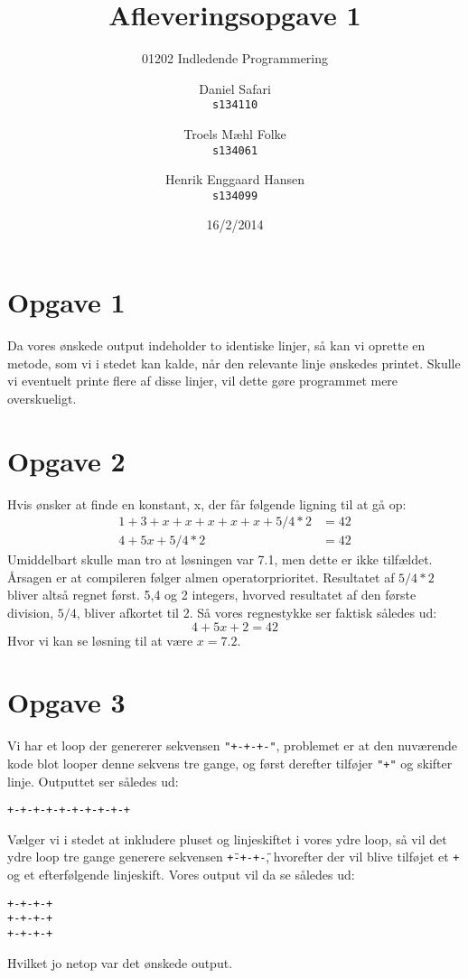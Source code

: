 \documentclass{scrartcl}
\begin{document}

\title{Afleveringsopgave 1}
\subtitle{01202 Indledende Programmering}
\author{
  Daniel Safari\\
  \texttt{s134110}
  \and
  Troels Mæhl Folke\\
  \texttt{s134061}
   \and
  Henrik Enggaard Hansen\\
  \texttt{s134099}
}
\date{16/2/2014}
\maketitle

\section*{Opgave 1}
Da vores ønskede output indeholder to identiske linjer, så kan vi oprette en metode, som vi i stedet kan kalde, når den relevante linje ønskedes printet. Skulle vi eventuelt printe flere af disse linjer, vil dette gøre programmet mere overskueligt.

\section*{Opgave 2}
Hvis ønsker at finde en konstant, x, der får følgende ligning til at gå op: 
\begin{align*}
1+3+x+x+x+x+x+5/4*2 & = 42 \\
         4+5x+5/4*2 & = 42
\end{align*}
Umiddelbart skulle man tro at løsningen var 7.1, men dette er ikke tilfældet. Årsagen er at compileren følger almen operatorprioritet. Resultatet af $5/4*2$ bliver altså regnet først. 5,4 og 2 integers, hvorved resultatet af den første division, $5/4$, bliver afkortet til 2. Så vores regnestykke ser faktisk således ud:
$$ 4+5x+2 = 42 $$
Hvor vi kan se løsning til at være $x=7.2$.


\section*{Opgave 3}
Vi har et loop der genererer sekvensen \texttt{"+-+-+-"}, problemet er at den nuværende kode blot looper denne sekvens tre gange, og først derefter tilføjer \texttt{"+"} og skifter linje. Outputtet ser således ud:
\begin{Verbatim}
+-+-+-+-+-+-+-+-+-+
\end{Verbatim}
Vælger vi i stedet at inkludere pluset og linjeskiftet i vores ydre loop, så vil det ydre loop tre gange generere sekvensen  \texttt{\"+-+-+-\"}, hvorefter der vil blive tilføjet et \texttt{+} og et efterfølgende linjeskift.
Vores output vil da se således ud:
\begin{Verbatim}
+-+-+-+
+-+-+-+
+-+-+-+
\end{Verbatim}
Hvilket jo netop var det ønskede output.
\end{document}
